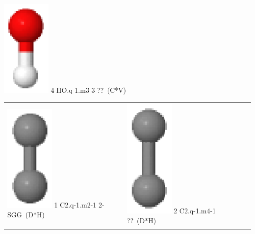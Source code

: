 \documentclass[10pt]{article}
\begin{document}
\begin{tabular}
\includegraphics[width=2.40000000000000000000cm]{HO.q-1.m3-3.eps} \tiny{4 \hspace{1.20000000000000000000cm} HO.q-1.m3-3 \hspace{5pt} ??~(C*V)} 
\\
\end{tabular}

\vspace{0.5cm}
\begin{tabular}{|
>{\centering\arraybackslash}p{2.40000000000000000000cm}|
>{\centering\arraybackslash}p{2.40000000000000000000cm}|
>{\centering\arraybackslash}p{2.40000000000000000000cm}|
>{\centering\arraybackslash}p{2.40000000000000000000cm}|
>{\centering\arraybackslash}p{2.40000000000000000000cm}|
}
\hline
\multicolumn{2}{|c|}{C$_{2}$} \\\hline
\includegraphics[width=2.40000000000000000000cm]{C2.q-1.m2-1.eps} \tiny{1 \hspace{1.20000000000000000000cm} C2.q-1.m2-1 \hspace{5pt} 2-SGG~(D*H)} &
\includegraphics[width=2.40000000000000000000cm]{C2.q-1.m4-1.eps} \tiny{2 \hspace{1.20000000000000000000cm} C2.q-1.m4-1 \hspace{5pt} ??~(D*H)} 
\\\cline{1-2}
\end{tabular}
\end{document}
